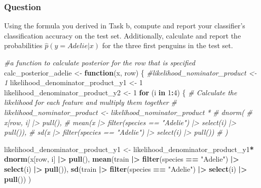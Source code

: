 \documentclass[
]{article}
\newenvironment{Shaded}{\begin{snugshade}}{\end{snugshade}}
\newcommand{\CommentTok}[1]{\textcolor[rgb]{0.56,0.35,0.01}{\textit{#1}}}
\newcommand{\ControlFlowTok}[1]{\textcolor[rgb]{0.13,0.29,0.53}{\textbf{#1}}}
\newcommand{\DecValTok}[1]{\textcolor[rgb]{0.00,0.00,0.81}{#1}}
\newcommand{\FunctionTok}[1]{\textcolor[rgb]{0.13,0.29,0.53}{\textbf{#1}}}
\newcommand{\NormalTok}[1]{#1}
\newcommand{\OtherTok}[1]{\textcolor[rgb]{0.56,0.35,0.01}{#1}}
\newcommand{\SpecialCharTok}[1]{\textcolor[rgb]{0.81,0.36,0.00}{\textbf{#1}}}
\newcommand{\StringTok}[1]{\textcolor[rgb]{0.31,0.60,0.02}{#1}}
\begin{document}
\hypertarget{question-4}{%
\subsubsection{Question}\label{question-4}}

Using the formula you derived in Task b, compute and report your
classifier's classification accuracy on the test set. Additionally,
calculate and report the probabilities \(\hat{p}( y = Adelie| x)\) for
the three first penguins in the test set.

\begin{Shaded}
\begin{Highlighting}[]
\CommentTok{\#a function to calculate posterior for the row that is specified}
\NormalTok{calc\_posterior\_adelie }\OtherTok{\textless{}{-}} \ControlFlowTok{function}\NormalTok{(x, row) \{}
  \CommentTok{\#likelihood\_nominator\_product \textless{}{-} 1}
\NormalTok{  likelihood\_denominator\_product\_y1 }\OtherTok{\textless{}{-}} \DecValTok{1}
\NormalTok{  likelihood\_denominator\_product\_y2 }\OtherTok{\textless{}{-}} \DecValTok{1}
  \ControlFlowTok{for}\NormalTok{ (i }\ControlFlowTok{in} \DecValTok{1}\SpecialCharTok{:}\DecValTok{4}\NormalTok{) \{}
    \CommentTok{\# Calculate the likelihood for each feature and multiply them together}
    \CommentTok{\# likelihood\_nominator\_product \textless{}{-} likelihood\_nominator\_product * }
    \CommentTok{\#                       dnorm(}
    \CommentTok{\#                         x[row, i] |\textgreater{} pull(), }
    \CommentTok{\#                         mean(x |\textgreater{} filter(species == "Adelie") |\textgreater{} select(i) |\textgreater{} pull()), }
    \CommentTok{\#                         sd(x |\textgreater{} filter(species == "Adelie") |\textgreater{} select(i) |\textgreater{} pull())}
    \CommentTok{\#                         )}
    
\NormalTok{    likelihood\_denominator\_product\_y1 }\OtherTok{\textless{}{-}}\NormalTok{ likelihood\_denominator\_product\_y1}\SpecialCharTok{*}
      \FunctionTok{dnorm}\NormalTok{(x[row, i] }\SpecialCharTok{|\textgreater{}} \FunctionTok{pull}\NormalTok{(), }
            \FunctionTok{mean}\NormalTok{(train }\SpecialCharTok{|\textgreater{}} \FunctionTok{filter}\NormalTok{(species }\SpecialCharTok{==} \StringTok{"Adelie"}\NormalTok{) }\SpecialCharTok{|\textgreater{}} \FunctionTok{select}\NormalTok{(i) }\SpecialCharTok{|\textgreater{}} \FunctionTok{pull}\NormalTok{()), }
            \FunctionTok{sd}\NormalTok{(train }\SpecialCharTok{|\textgreater{}} \FunctionTok{filter}\NormalTok{(species }\SpecialCharTok{==} \StringTok{"Adelie"}\NormalTok{) }\SpecialCharTok{|\textgreater{}} \FunctionTok{select}\NormalTok{(i) }\SpecialCharTok{|\textgreater{}} \FunctionTok{pull}\NormalTok{())}
\NormalTok{                        )}
    

\end{Highlighting}
\end{Shaded}
\end{document}
